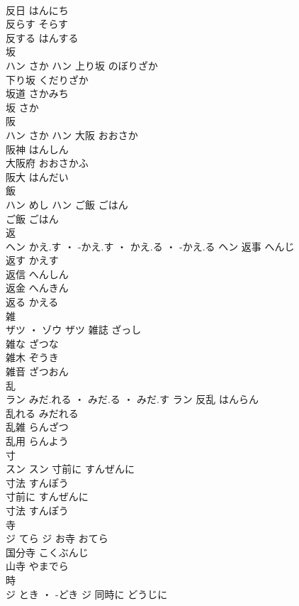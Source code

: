 \documentclass[8pt]{extreport}
\begin{document}
\begin{CJK}{UTF8}{min}
\\	反日	はんにち	
\\	反らす	そらす	
\\	反する	はんする	
\\	坂	
\\	ハン	さか	ハン	上り坂	のぼりざか	
\\	下り坂	くだりざか	
\\	坂道	さかみち	
\\	坂	さか	
\\	阪	
\\	ハン	さか	ハン	大阪	おおさか	
\\	阪神	はんしん	
\\	大阪府	おおさかふ	
\\	阪大	はんだい	
\\	飯	
\\	ハン	めし	ハン	ご飯	ごはん	
\\	ご飯	ごはん	
\\	返	
\\	ヘン	かえ.す ・ -かえ.す ・ かえ.る ・ -かえ.る	ヘン	返事	へんじ	
\\	返す	かえす	
\\	返信	へんしん	
\\	返金	へんきん	
\\	返る	かえる	
\\	雑	
\\	ザツ ・ ゾウ		ザツ	雑誌	ざっし	
\\	雑な	ざつな	
\\	雑木	ぞうき	
\\	雑音	ざつおん	
\\	乱	
\\	ラン	みだ.れる ・ みだ.る ・ みだ.す	ラン	反乱	はんらん	
\\	乱れる	みだれる	
\\	乱雑	らんざつ	
\\	乱用	らんよう	
\\	寸	
\\	スン		スン	寸前に	すんぜんに	
\\	寸法	すんぽう	
\\	寸前に	すんぜんに	
\\	寸法	すんぽう	
\\	寺	
\\	ジ	てら	ジ	お寺	おてら	
\\	国分寺	こくぶんじ	
\\	山寺	やまでら	
\\	時	
\\	ジ	とき ・ -どき	ジ	同時に	どうじに	

\end{CJK}
\end{document}
